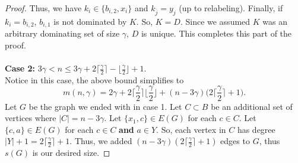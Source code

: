 \documentclass[12pt]{amsart}
\newcommand{\ceil}[1]{\lceil{#1}\rceil}
\begin{document}
\begin{proof}
Thus, we have $k_i \in \{b_{i,2},x_i\}$ and $k_{\overline{j}} = y_j$ (up to relabeling). Finally, if $k_i = b_{i,2}$, $b_{i,1}$ is not dominated by $K$. So, $K = D$. Since we assumed $K$ was an arbitrary dominating set of size $\gamma$, $D$ is unique. This completes this part of the proof.\\\\
\textbf{Case 2:} $3\gamma < n \leq 3\gamma + 2 \lceil \frac{\gamma}{2} \rceil - \lfloor \frac{\gamma}{2}\rfloor+ 1$.\\
Notice in this case, the above bound simplifies to $$m(n,\gamma) = 2 \gamma + 2 \Big\lceil \frac{\gamma}{2} \Big\rceil \Big\lfloor \frac{\gamma}{2} \Big\rfloor + (n-3\gamma)\Big(2\Big\lceil\frac{\gamma}{2}\Big\rceil + 1\Big).$$
Let $G$ be the graph we ended with in case 1. Let $C \subset B$ be an additional set of vertices where $|C| = n - 3\gamma$. Let $\{x_1,c\} \in E(G)$ for each $c \in C$. Let $\{c,a\} \in E(G)$ for each $c \in C$ \textbf{and} $a \in Y$. So, each vertex in $C$ has degree $|Y| + 1 = 2\ceil{\frac{\gamma}{2}} + 1$. Thus, we added $(n-3\gamma)(2\ceil{\frac{\gamma}{2}} + 1)$ edges to $G$, thus $s(G)$ is our desired size. 
    
    


\end{proof}
\end{document}
